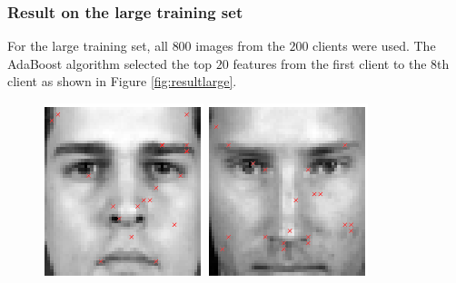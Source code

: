 \subsubsection{Result on the large training set}
For the large training set, all $800$ images from the $200$ clients were used. The AdaBoost algorithm selected the top $20$ features from the first client to the 8th client as shown in \mbox{Figure} \ref{fig:resultlarge}.
\begin{figure}[ht]
\begin{center}
\includegraphics[width=\textwidth/9]{ch4/figures/NoC1.png}
\includegraphics[width=\textwidth/9]{ch4/figures/NoC2.png}

\end{center}
\end{figure}

